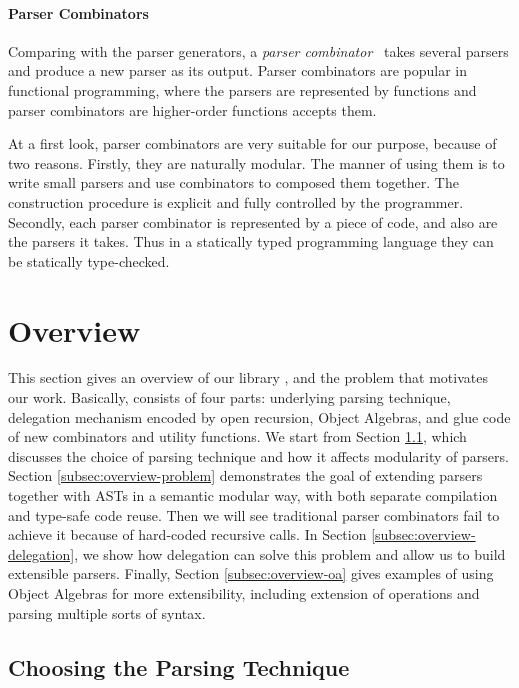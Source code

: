 \paragraph{Parser Combinators}
Comparing with the parser generators, a \textit{parser combinator}~\cite{burge1975,Wadler1985}
takes several parsers and produce a new parser as its output. Parser combinators are
popular in functional programming, where the parsers are represented
by functions and parser combinators are higher-order functions accepts
them.

At a first look, parser combinators are very suitable for our purpose, because of two
reasons. Firstly, they are naturally modular. The manner of using them
is to write small parsers and use combinators to composed them
together. The construction procedure is explicit and fully controlled
by the programmer. Secondly, each parser combinator is represented by
a piece of code, and also are the parsers it takes. Thus in a
statically typed programming language they can be statically
type-checked.

\section{Overview}\label{sec:overview}

This section gives an overview of our library \name, and the problem that motivates our work. Basically, \name consists of four parts: underlying parsing technique, delegation mechanism encoded by open recursion, Object Algebras, and glue code of new combinators and utility functions. We start from Section \ref{subsec:overview-parsing}, which discusses the choice of parsing technique and how it affects modularity of parsers. Section \ref{subsec:overview-problem} demonstrates the goal of extending parsers together with ASTs in a semantic modular way, with both separate compilation and type-safe code reuse. Then we will see traditional parser combinators fail to achieve it because of hard-coded recursive calls. In Section \ref{subsec:overview-delegation}, we show how delegation can solve this problem and allow us to build extensible parsers. Finally, Section \ref{subsec:overview-oa} gives examples of using Object Algebras for more extensibility, including extension of operations and parsing multiple sorts of syntax.

\subsection{Choosing the Parsing Technique}\label{subsec:overview-parsing}

